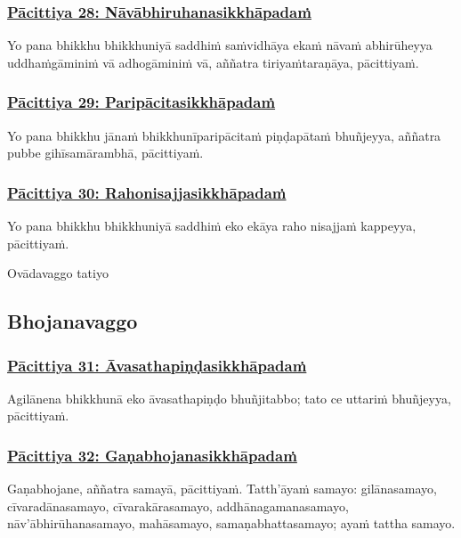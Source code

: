\subsubsection*{\hyperref[exp28]{Pācittiya 28: Nāvābhiruhanasikkhāpadaṁ}}
\label{pac28}
Yo pana bhikkhu bhikkhuniyā saddhiṁ saṁvidhāya ekaṁ nāvaṁ abhirūheyya uddhaṁgāminiṁ vā adhogāminiṁ vā, aññatra tiriyaṁtaraṇāya, pācittiyaṁ.

\subsubsection*{\hyperref[exp29]{Pācittiya 29: Paripācitasikkhāpadaṁ}}
\label{pac29}
Yo pana bhikkhu jānaṁ bhikkhunīparipācitaṁ piṇḍapātaṁ bhuñjeyya, aññatra pubbe gihīsamārambhā, pācittiyaṁ.

\subsubsection*{\hyperref[exp30]{Pācittiya 30: Rahonisajjasikkhāpadaṁ}}
\label{pac30}
Yo pana bhikkhu bhikkhuniyā saddhiṁ eko ekāya raho nisajjaṁ kappeyya, pācittiyaṁ.

\begin{center}
  Ovādavaggo tatiyo
\end{center}

\subsection{Bhojanavaggo}
\vspace{0.2cm}

\subsubsection*{\hyperref[exp31]{Pācittiya 31: Āvasathapiṇḍasikkhāpadaṁ}}
\label{pac31}
Agilānena bhikkhunā eko āvasathapiṇḍo bhuñjitabbo; tato ce uttariṁ bhuñjeyya, pācittiyaṁ.

\subsubsection*{\hyperref[exp32]{Pācittiya 32: Gaṇabhojanasikkhāpadaṁ}}
\label{pac32}
Gaṇabhojane, aññatra samayā, pācittiyaṁ. Tatth'āyaṁ samayo: gilānasamayo, cīvaradānasamayo, cīvarakārasamayo, addhānagamanasamayo, nāv'ābhirūhanasamayo, mahāsamayo, samaṇabhattasamayo; ayaṁ tattha samayo.

